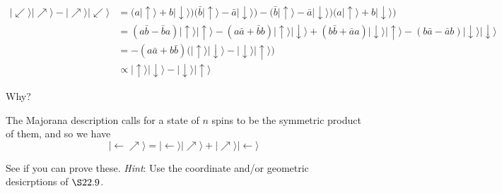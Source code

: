 \documentclass[../road-to-reality.tex]{subfiles}
\begin{document}
\begin{questions}
\begin{solution}
			\begin{align*}
				|\!\swarrow\rangle|\!\nearrow\rangle - |\!\nearrow\rangle|\!\swarrow\rangle &= \big(a|\!\uparrow\rangle + b|\!\downarrow\rangle\big)\big(\bar{b}|\!\uparrow\rangle - \bar{a}|\!\downarrow\rangle\big) - \big(\bar{b}|\!\uparrow\rangle - \bar{a}|\!\downarrow\rangle\big)\big(a|\!\uparrow\rangle + b|\!\downarrow\rangle\big) \\
				&= (a\bar{b} - \bar{b}a)|\!\uparrow\rangle|\!\uparrow\rangle - (a\bar{a} + \bar{b}b)|\!\uparrow\rangle|\!\downarrow\rangle + (b\bar{b} + \bar{a}a)|\!\downarrow\rangle|\!\uparrow\rangle - (b\bar{a} - \bar{a}b)|\!\downarrow\rangle|\!\downarrow\rangle \\
				&= -(a\bar{a} + b\bar{b})\big(|\!\uparrow\rangle|\!\downarrow\rangle - |\!\downarrow\rangle|\!\uparrow\rangle\big) \\
				&\propto |\!\uparrow\rangle|\!\downarrow\rangle - |\!\downarrow\rangle|\!\uparrow\rangle
			\end{align*}
		\end{solution}
	
		\question Why?
		
		\begin{solution}
			The Majorana description calls for a state of $n$ spins to be the symmetric product of them, and so we have
			\[
				|\!\leftarrow\nearrow\rangle = |\!\leftarrow\rangle|\!\nearrow\rangle + |\!\nearrow\rangle|\!\leftarrow\rangle
			\]
		\end{solution}
	
		\question See if you can prove these. \textit{Hint}: Use the coordinate and/or geometric desicrptions of $\S22.9$.
		

\end{questions}
\end{document}

